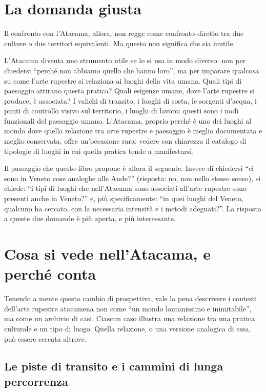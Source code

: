 \section{La domanda giusta}

Il confronto con l'Atacama, allora, non regge come confronto diretto tra due culture o due territori equivalenti. Ma questo non significa che sia inutile.

L'Atacama diventa uno strumento utile se lo si usa in modo diverso: non per chiedersi ``perché non abbiamo quello che hanno loro'', ma per imparare qualcosa su come l'arte rupestre si relaziona ai luoghi della vita umana. Quali tipi di paesaggio attirano questa pratica? Quali esigenze umane, dove l'arte rupestre si produce, è associata? I valichi di transito, i luoghi di sosta, le sorgenti d'acqua, i punti di controllo visivo sul territorio, i luoghi di lavoro: questi sono i nodi funzionali del paesaggio umano. L'Atacama, proprio perché è uno dei luoghi al mondo dove quella relazione tra arte rupestre e paesaggio è meglio documentata e meglio conservata, offre un'occasione rara: vedere con chiarezza il catalogo di tipologie di luoghi in cui quella pratica tende a manifestarsi.

Il passaggio che questo libro propone è allora il seguente. Invece di chiedersi ``ci sono in Veneto cose analoghe alle Ande?'' (risposta: no, non nello stesso senso), si chiede: ``i tipi di luoghi che nell'Atacama sono associati all'arte rupestre sono presenti anche in Veneto?'' e, più specificamente: ``in quei luoghi del Veneto, qualcuno ha cercato, con la necessaria intensità e i metodi adeguati?''. La risposta a queste due domande è più aperta, e più interessante.

\section{Cosa si vede nell'Atacama, e perché conta}

Tenendo a mente questo cambio di prospettiva, vale la pena descrivere i contesti dell'arte rupestre atacamena non come ``un mondo lontanissimo e inimitabile'', ma come un archivio di casi. Ciascun caso illustra una relazione tra una pratica culturale e un tipo di luogo. Quella relazione, o una versione analogica di essa, può essere cercata altrove.

\subsection{Le piste di transito e i cammini di lunga percorrenza}

